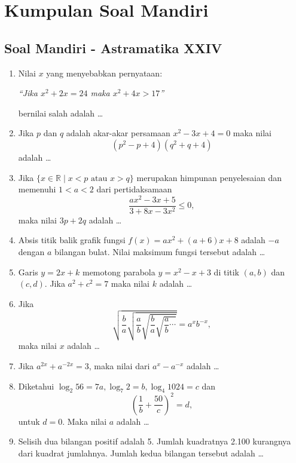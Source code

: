 \chapter{Kumpulan Soal Mandiri}
\hrulefill

\section{Soal Mandiri - Astramatika XXIV}
\begin{enumerate}

\item Nilai $x$ yang menyebabkan pernyataan:
	\begin{center}
	\emph{``Jika $x^2+2x = 24$ maka $x^2+4x>17$''}
	\end{center}
bernilai salah adalah \ldots

\item Jika $p$ dan $q$ adalah akar-akar persamaan $x^2-3x+4 = 0$ maka nilai $$(p^2-p+4)(q^2+q+4)$$ adalah \ldots

\item Jika $\{x\in\mathbb{R} \mid x<p \textrm{ atau } x>q\}$ merupakan himpunan penyelesaian dan memenuhi $1<a<2$ dari pertidaksamaan $${\displaystyle \frac{ax^2-3x+5}{3+8x-3x^2}\leq 0},$$maka nilai $3p+2q$ adalah \ldots

\item Absis titik balik grafik fungsi $f(x) = ax^2 + (a+6)x + 8$ adalah $-a$ dengan $a$ bilangan bulat. Nilai maksimum fungsi tersebut adalah \ldots

\item Garis $y=2x+k$ memotong parabola $y=x^2-x+3$ di titik $(a,b)$ dan $(c,d)$. Jika $a^2+c^2 = 7$ maka nilai $k$ adalah \ldots

\item Jika $${\displaystyle \sqrt{\frac{b}{a}\sqrt{\frac{a}{b}\sqrt{\frac{b}{a}\sqrt{\frac{a}{b}\cdots}}}}} = a^xb^{-x},$$ maka nilai $x$ adalah \ldots

\item Jika $a^{2x} + a^{-2x} = 3$, maka nilai dari $a^x - a^{-x}$ adalah \ldots

\item Diketahui $\log_2 56 = 7a, \log_7 2 = b, \log_4 1024 = c$ dan $${\displaystyle \left(\frac{1}{b} + \frac{50}{c}\right)^2 = d},$$ untuk $d=0$. Maka nilai $a$ adalah \ldots

\item Selisih dua bilangan positif adalah 5. Jumlah kuadratnya 2.100 kurangnya dari kuadrat jumlahnya. Jumlah kedua bilangan tersebut adalah \ldots


\end{enumerate}

